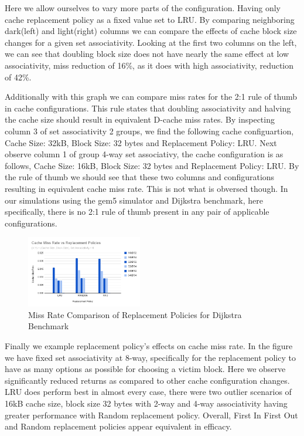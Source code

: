 \documentclass[conference]{IEEEtran}
\begin{document}
Here we allow ourselves to vary more parts of the configuration. Having only cache replacement policy as a fixed value set to LRU. By comparing neighboring dark(left) and light(right) columns we can compare the effects of cache block size changes for a given set associativity. Looking at the first two columns on the left, we can see that doubling block size does not have nearly the same effect at low associativity, miss reduction of 16\%, as it does with high associativity, reduction of 42\%.

Additionally with this graph we can compare miss rates for the 2:1 rule of thumb in cache configurations. This rule states that doubling associativity and halving the cache size should result in equivalent D-cache miss rates. By inspecting column 3 of set associativity 2 groups, we find the following cache configuartion, Cache Size: 32kB, Block Size: 32 bytes and Replacement Policy: LRU. Next observe column 1 of group 4-way set associativy, the cache configuration is as follows, Cache Size: 16kB, Block Size: 32 bytes and Replacement Policy: LRU. By the rule of thumb we should see that these two columns and configurations resulting in equivalent cache miss rate. This is not what is obversed though. In our simulations using the gem5 simulator and Dijkstra benchmark, here specifically, there is no 2:1 rule of thumb present in any pair of applicable configurations.

\begin{figure}[H]
  \centering
  \includegraphics[width=0.45\textwidth]{dijkstraFigures/CacheMissRatevsReplacementPolicies.png}
  \caption{Miss Rate Comparison of Replacement Policies for Dijkstra Benchmark}
  \label{fig:EmpC1-Training}
\end{figure}

Finally we example replacement policy's effects on cache miss rate. In the figure we have fixed set associativity at 8-way, specifically for the replacement policy to have as many options as possible for choosing a victim block. Here we observe significantly reduced returns as compared to other cache configuration changes. LRU does perform best in almost every case, there were two outlier scenarios of 16kB cache size, block size 32 bytes with 2-way and 4-way associativity having greater performance with Random replacement policy. Overall, First In First Out and Random replacement policies appear equivalent in efficacy. 
\end{document}
